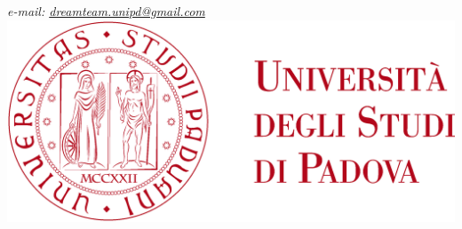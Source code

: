 \begin{titlepage}
\begin{center}
\textsl{ e-mail: \href{mailto:dreamteam.unipd@gmail.com}{dreamteam.unipd@gmail.com} } \\[1cm]

		\includegraphics[scale = 0.055]{../latex/images/logoUniPD.png}


	\end{center}
\end{titlepage}
